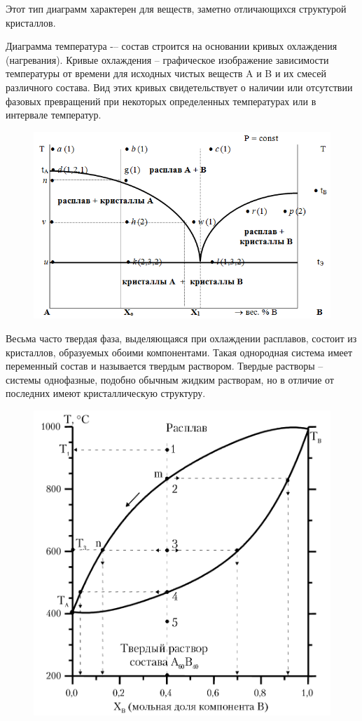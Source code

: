 \documentclass[14pt,a4paper]{scrartcl}
\begin{document}
Этот тип диаграмм характерен для веществ, заметно отличающихся структурой кристаллов.

Диаграмма температура -– состав строится на основании кривых охлаждения (нагревания). Кривые охлаждения – графическое изображение зависимости температуры от времени для исходных чистых веществ A и B и их смесей различного состава. Вид этих кривых свидетельствует о наличии или отсутствии фазовых превращений при некоторых определенных температурах или в интервале температур. 
\begin{figure}[H]
\centering
\includegraphics[scale=.45]{cristallization-diagram.png}
\caption{}
\label{}
\end{figure}

Весьма часто твердая фаза, выделяющаяся при охлаждении расплавов, состоит из кристаллов, образуемых обоими компонентами. Такая однородная система имеет переменный состав и называется твердым раствором. Твердые растворы – системы однофазные, подобно обычным жидким растворам, но в отличие от последних имеют кристаллическую структуру.

\begin{figure}[H]
\centering
\includegraphics[scale=.600]{cristallization-diagram2.png}
\caption{}
\label{}
\end{figure}
\end{document}
